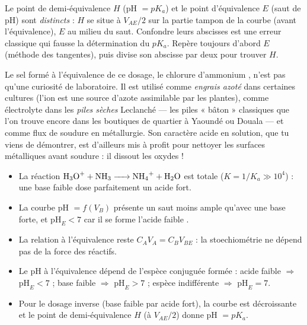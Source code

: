 \documentclass[11pt]{article}
\begin{document}
\begin{attention}
Le point de demi-équivalence $H$ (pH $= pK_a$) et le point d'équivalence $E$ (saut de pH) sont \emph{distincts} : $H$ se situe à $V_{AE}/2$ sur la partie tampon de la courbe (avant l'équivalence), $E$ au milieu du saut. Confondre leurs abscisses est une erreur classique qui fausse la détermination du $pK_a$. Repère toujours d'abord $E$ (méthode des tangentes), puis divise son abscisse par deux pour trouver $H$.
\end{attention}

\begin{savaistu}
Le sel formé à l'équivalence de ce dosage, le chlorure d'ammonium , n'est pas qu'une curiosité de laboratoire. Il est utilisé comme \emph{engrais azoté} dans certaines cultures (l'ion  est une source d'azote assimilable par les plantes), comme électrolyte dans les \emph{piles sèches} Leclanché — les piles « bâton » classiques que l'on trouve encore dans les boutiques de quartier à Yaoundé ou Douala — et comme flux de soudure en métallurgie. Son caractère acide en solution, que tu viens de démontrer, est d'ailleurs mis à profit pour nettoyer les surfaces métalliques avant soudure : il dissout les oxydes !
\end{savaistu}

\begin{aretenir}
\begin{itemize}
\item La réaction $\ce{H3O+ + NH3 -> NH4+ + H2O}$ est totale ($K = 1/K_a \gg 10^{4}$) : une base faible dose parfaitement un acide fort.
\item La courbe pH $= f(V_B)$ présente un saut moins ample qu'avec une base forte, et $\text{pH}_E < 7$ car il se forme l'acide faible .
\item La relation à l'équivalence reste $C_A V_A = C_B V_{BE}$ : la stoechiométrie ne dépend pas de la force des réactifs.
\item Le pH à l'équivalence dépend de l'espèce conjuguée formée : acide faible $\Rightarrow$ $\text{pH}_E < 7$ ; base faible $\Rightarrow$ $\text{pH}_E > 7$ ; espèce indifférente $\Rightarrow$ $\text{pH}_E = 7$.
\item Pour le dosage inverse (base faible par acide fort), la courbe est décroissante et le point de demi-équivalence $H$ (à $V_{AE}/2$) donne pH $= pK_a$.
\end{itemize}
\end{aretenir}
\end{document}
